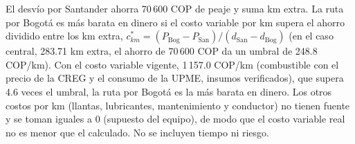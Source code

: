 El desvío por Santander ahorra 70\,600 COP de peaje y suma km extra. La ruta por Bogotá es más barata en dinero si el costo variable por km supera el ahorro dividido entre los km extra, $c_{km}^{*} = (P_{\mathrm{Bog}} - P_{\mathrm{San}}) / (d_{\mathrm{San}} - d_{\mathrm{Bog}})$ (en el caso central, 283.71 km extra, el ahorro de 70\,600 COP da un umbral de 248.8 COP/km). Con el costo variable vigente, 1\,157.0 COP/km (combustible con el precio de la CREG y el consumo de la UPME, insumos verificados), que supera 4.6 veces el umbral, la ruta por Bogotá es la más barata en dinero. Los otros costos por km (llantas, lubricantes, mantenimiento y conductor) no tienen fuente y se toman iguales a 0 (supuesto del equipo), de modo que el costo variable real no es menor que el calculado. No se incluyen tiempo ni riesgo.

